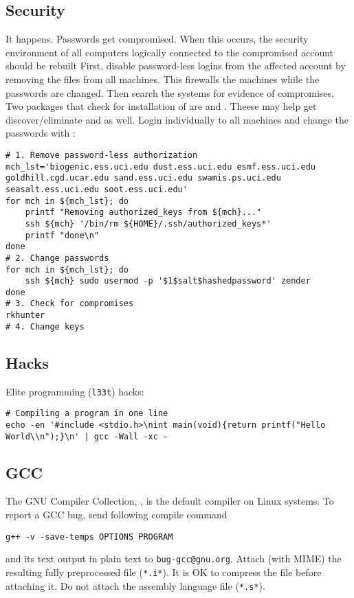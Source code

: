 \documentclass[12pt,twoside]{article}
\begin{document}
\subsection{Security}\label{sxn:scr}
It happens. 
Passwords get compromised.
When this occurs, the security environment of all computers logically
connected to the compromised account should be rebuilt
First, disable password-less logins from the affected account by
removing the  files from all machines.
This firewalls the machines while the passwords are changed.
Then search the systems for evidence of compromises.
Two packages that check for installation of  are
 and .
Theese may help get discover/eliminate  and
 as well.
Login individually to all machines and change the passwords with
: 
\begin{verbatim}
# 1. Remove password-less authorization
mch_lst='biogenic.ess.uci.edu dust.ess.uci.edu esmf.ess.uci.edu goldhill.cgd.ucar.edu sand.ess.uci.edu swamis.ps.uci.edu seasalt.ess.uci.edu soot.ess.uci.edu'
for mch in ${mch_lst}; do
    printf "Removing authorized_keys from ${mch}..."
    ssh ${mch} '/bin/rm ${HOME}/.ssh/authorized_keys*'
    printf "done\n"
done
# 2. Change passwords
for mch in ${mch_lst}; do
    ssh ${mch} sudo usermod -p '$1$salt$hashedpassword' zender
done
# 3. Check for compromises
rkhunter
# 4. Change keys
\end{verbatim}

\subsection{Hacks}\label{sxn:hck}
Elite programming (\texttt{l33t}) hacks:
\begin{verbatim}
# Compiling a program in one line
echo -en '#include <stdio.h>\nint main(void){return printf("Hello World\\n");}\n' | gcc -Wall -xc -
\end{verbatim}

\subsection{GCC}\label{sxn:gcc}
The GNU Compiler Collection, , is the default compiler on 
Linux systems.
To report a GCC bug, send following compile command
\begin{verbatim}
g++ -v -save-temps OPTIONS PROGRAM
\end{verbatim}
and its text output in plain text to \verb'bug-gcc@gnu.org'.
Attach (with MIME) the resulting fully preprocessed file
(\verb'*.i*').
It is OK to compress the file before attaching it.
Do not attach the assembly language file (\verb'*.s*').
\end{document}
